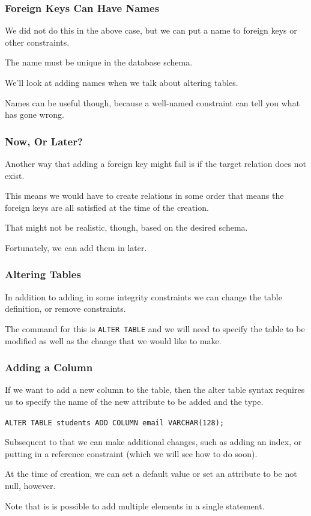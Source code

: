 \begin{frame}
\frametitle{Foreign Keys Can Have Names}

We did not do this in the above case, but we can put a name to foreign keys or other constraints. 

The name must be unique in the database schema. 

We'll look at adding names when we talk about altering tables. 

Names can be useful though, because a well-named constraint can tell you what has gone wrong.

\end{frame}

\begin{frame}
\frametitle{Now, Or Later?}

Another way that adding a foreign key might fail is if the target relation does not exist. 

This means we would have to create relations in some order that means the foreign keys are all satisfied at the time of the creation. 

That might not be realistic, though, based on the desired schema. 

Fortunately, we can add them in later.

\end{frame}


\begin{frame}
\frametitle{Altering Tables}

In addition to adding in some integrity constraints we can change the table definition, or remove constraints. 

The command for this is \texttt{ALTER TABLE} and we will need to specify the table to be modified as well as the change that we would like to make. 

\end{frame}

\begin{frame}
\frametitle{Adding a Column}

If we want to add a new column to the table, then the alter table syntax requires us to specify the name of the new attribute to be added and the type. 

\texttt{ALTER TABLE students ADD COLUMN email VARCHAR(128);} 

Subsequent to that we can make additional changes, such as adding an index, or putting in a reference constraint (which we will see how to do soon). 

At the time of creation, we can set a default value or set an attribute to be not null, however. 

Note that is is possible to add multiple elements in a single statement. 

\end{frame}

